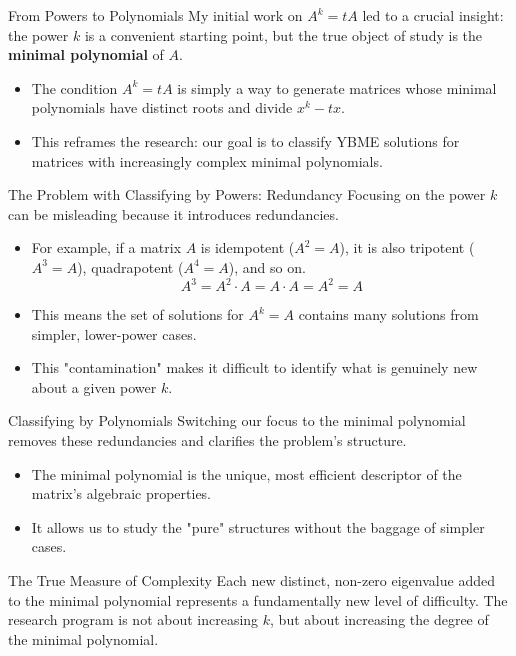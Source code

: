 \documentclass{beamer}
\begin{document}
\begin{frame}{From Powers to Polynomials}
  My initial work on $A^k=tA$ led to a crucial insight: the power $k$ is a convenient starting point, but the true object of study is the \textbf{minimal polynomial} of $A$.
  \begin{itemize}
    \item The condition $A^k=tA$ is simply a way to generate matrices whose minimal polynomials have distinct roots and divide $x^k-tx$.
    \pause
    \item This reframes the research: our goal is to classify YBME solutions for matrices with increasingly complex minimal polynomials.
  \end{itemize}
\end{frame}

\begin{frame}{The Problem with Classifying by Powers: Redundancy}
  Focusing on the power $k$ can be misleading because it introduces redundancies.
  \begin{itemize}
    \item For example, if a matrix $A$ is idempotent ($A^2=A$), it is also tripotent ($A^3=A$), quadrapotent ($A^4=A$), and so on.
    \[ A^3 = A^2 \cdot A = A \cdot A = A^2 = A \]
    \item This means the set of solutions for $A^k=A$ contains many solutions from simpler, lower-power cases.
    \pause
    \item This "contamination" makes it difficult to identify what is genuinely new about a given power $k$.
  \end{itemize}
\end{frame}

\begin{frame}{Classifying by Polynomials}
  Switching our focus to the minimal polynomial removes these redundancies and clarifies the problem's structure.
  \begin{itemize}
    \item The minimal polynomial is the unique, most efficient descriptor of the matrix's algebraic properties.
    \item It allows us to study the "pure" structures without the baggage of simpler cases.
  \end{itemize}
  \begin{alertblock}{The True Measure of Complexity}
  Each new distinct, non-zero eigenvalue added to the minimal polynomial represents a fundamentally new level of difficulty. The research program is not about increasing $k$, but about increasing the degree of the minimal polynomial.
  \end{alertblock}
\end{frame}
\end{document}
